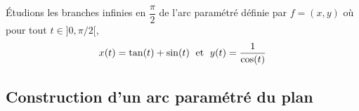 \documentclass[french,11pt,twoside]{VcCours}
\begin{document}
%


\begin{Exemple} Étudions les branches infinies en $\dfrac{\pi}{2}$ de l'arc paramétré définie par $f=(x,y)$ où pour tout $t \in ]0, \pi/2[$,
$$ x(t) = \tan(t)+\sin(t) \; \hbox{ et } \; y(t)=\dfrac{1}{\cos(t)}$$

\end{Exemple}
\newpage

\subsection{Construction d'un arc paramétré du plan}
\end{document}
